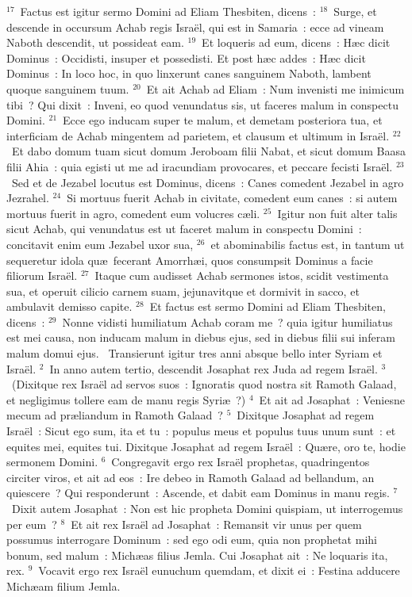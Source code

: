 ${}^{17}$~Factus est igitur sermo Domini ad Eliam Thesbiten, dicens~:
${}^{18}$~Surge, et descende in occursum Achab regis Isra\"el, qui est in Samaria~: ecce ad vineam Naboth descendit, ut possideat eam.
${}^{19}$~Et loqueris ad eum, dicens~: H\ae c dicit Dominus~: Occidisti, insuper et possedisti. Et post h\ae c addes~: H\ae c dicit Dominus~: In loco hoc, in quo linxerunt canes sanguinem Naboth, lambent quoque sanguinem tuum.
${}^{20}$~Et ait Achab ad Eliam~: Num invenisti me inimicum tibi~? Qui dixit~: Inveni, eo quod venundatus sis, ut faceres malum in conspectu Domini.
${}^{21}$~Ecce ego inducam super te malum, et demetam posteriora tua, et interficiam de Achab mingentem ad parietem, et clausum et ultimum in Isra\"el.
${}^{22}$~Et dabo domum tuam sicut domum Jeroboam filii Nabat, et sicut domum Baasa filii Ahia~: quia egisti ut me ad iracundiam provocares, et peccare fecisti Isra\"el.
${}^{23}$~Sed et de Jezabel locutus est Dominus, dicens~: Canes comedent Jezabel in agro Jezrahel.
${}^{24}$~Si mortuus fuerit Achab in civitate, comedent eum canes~: si autem mortuus fuerit in agro, comedent eum volucres c\ae li.
${}^{25}$~Igitur non fuit alter talis sicut Achab, qui venundatus est ut faceret malum in conspectu Domini~: concitavit enim eum Jezabel uxor sua,
${}^{26}$~et abominabilis factus est, in tantum ut sequeretur idola qu\ae\ fecerant Amorrh\ae i, quos consumpsit Dominus a facie filiorum Isra\"el.
${}^{27}$~Itaque cum audisset Achab sermones istos, scidit vestimenta sua, et operuit cilicio carnem suam, jejunavitque et dormivit in sacco, et ambulavit demisso capite.
${}^{28}$~Et factus est sermo Domini ad Eliam Thesbiten, dicens~:
${}^{29}$~Nonne vidisti humiliatum Achab coram me~? quia igitur humiliatus est mei causa, non inducam malum in diebus ejus, sed in diebus filii sui inferam malum domui ejus.
~Transierunt igitur tres anni absque bello inter Syriam et Isra\"el.
${}^{2}$~In anno autem tertio, descendit Josaphat rex Juda ad regem Isra\"el.
${}^{3}$~(Dixitque rex Isra\"el ad servos suos~: Ignoratis quod nostra sit Ramoth Galaad, et negligimus tollere eam de manu regis Syri\ae~?)
${}^{4}$~Et ait ad Josaphat~: Veniesne mecum ad pr\ae liandum in Ramoth Galaad~?
${}^{5}$~Dixitque Josaphat ad regem Isra\"el~: Sicut ego sum, ita et tu~: populus meus et populus tuus unum sunt~: et equites mei, equites tui. Dixitque Josaphat ad regem Isra\"el~: Qu\ae re, oro te, hodie sermonem Domini.
${}^{6}$~Congregavit ergo rex Isra\"el prophetas, quadringentos circiter viros, et ait ad eos~: Ire debeo in Ramoth Galaad ad bellandum, an quiescere~? Qui responderunt~: Ascende, et dabit eam Dominus in manu regis.
${}^{7}$~Dixit autem Josaphat~: Non est hic propheta Domini quispiam, ut interrogemus per eum~?
${}^{8}$~Et ait rex Isra\"el ad Josaphat~: Remansit vir unus per quem possumus interrogare Dominum~: sed ego odi eum, quia non prophetat mihi bonum, sed malum~: Mich\ae as filius Jemla. Cui Josaphat ait~: Ne loquaris ita, rex.
${}^{9}$~Vocavit ergo rex Isra\"el eunuchum quemdam, et dixit ei~: Festina adducere Mich\ae am filium Jemla.


